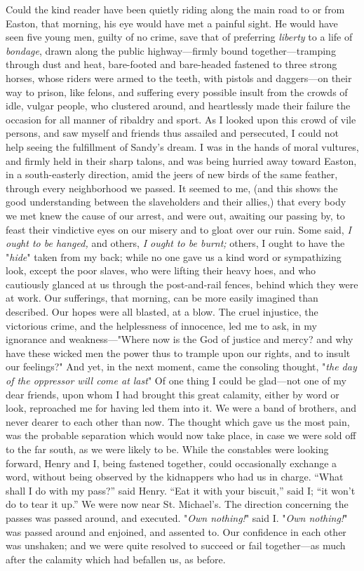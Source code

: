 Could the kind reader have been quietly riding along the main road to or
from Easton, that morning, his eye would have met a painful sight. He
would have seen five young men, guilty of no crime, save that of
preferring \emph{liberty} to a life of \emph{bondage}, drawn
{\protect\hypertarget{295}{}{}}along the public highway---firmly bound
together---tramping through dust and heat, bare-footed and bare-headed
fastened to three strong horses, whose riders were armed to the teeth,
with pistols and daggers---on their way to prison, like felons, and
suffering every possible insult from the crowds of idle, vulgar people,
who clustered around, and heartlessly made their failure the occasion
for all manner of ribaldry and sport. As I looked upon this crowd of
vile persons, and saw myself and friends thus assailed and persecuted, I
could not help seeing the fulfillment of Sandy's dream. I was in the
hands of moral vultures, and firmly held in their sharp talons, and was
being hurried away toward Easton, in a south-easterly direction, amid
the jeers of new birds of the same feather, through every neighborhood
we passed. It seemed to me, (and this shows the good understanding
between the slaveholders and their allies,) that every body we met knew
the cause of our arrest, and were out, awaiting our passing by, to feast
their vindictive eyes on our misery and to gloat over our ruin. Some
said, \emph{I ought to be hanged,} and others, \emph{I ought to be
burnt;} others, I ought to have the "\emph{hide}" taken from my back;
while no one gave us a kind word or sympathizing look, except the poor
slaves, who were lifting their heavy hoes, and who cautiously glanced at
us through the post-and-rail fences, behind which they were at work. Our
sufferings, that morning, can be more easily imagined than described.
Our hopes were all blasted, at a blow. The cruel injustice, the
victorious crime, and the helplessness of innocence, led me to ask, in
my ignorance and weakness---"Where now is the God
{\protect\hypertarget{296}{}{}}of justice and mercy? and why have these
wicked men the power thus to trample upon our rights, and to insult our
feelings?" And yet, in the next moment, came the consoling thought,
"\emph{the day of the oppressor will come at last}" Of one thing I could
be glad---not one of my dear friends, upon whom I had brought this great
calamity, either by word or look, reproached me for having led them into
it. We were a band of brothers, and never dearer to each other than now.
The thought which gave us the most pain, was the probable separation
which would now take place, in case we were sold off to the far south,
as we were likely to be. While the constables were looking forward,
Henry and I, being fastened together, could occasionally exchange a
word, without being observed by the kidnappers who had us in charge.
``What shall I do with my pass?'' said Henry. ``Eat it with your
biscuit,'' said I; ``it won't do to tear it up.'' We were now near St.
Michael's. The direction concerning the passes was passed around, and
executed. "\emph{Own nothing!}" said I. "\emph{Own nothing!}" was passed
around and enjoined, and assented to. Our confidence in each other was
unshaken; and we were quite resolved to succeed or fail together---as
much after the calamity which had befallen us, as before.

